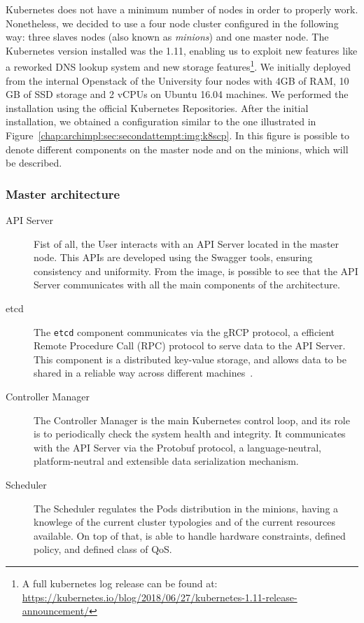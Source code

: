 Kubernetes does not have a minimum number of nodes in order to properly work.
Nonetheless, we decided to use a four node cluster configured in the following
way: three slaves nodes (also known as \emph{minions}) and one master node. The
Kubernetes version installed was the 1.11, enabling us to exploit new features
like a reworked DNS lookup system and new storage features\footnote{A full
  kubernetes log release can be found at:
  \url{https://kubernetes.io/blog/2018/06/27/kubernetes-1.11-release-announcement/}}.
We initially deployed from the internal Openstack of the University four nodes
with 4GB of RAM, 10 GB of SSD storage and 2 vCPUs on Ubuntu 16.04 machines. We
performed the installation using the official Kubernetes Repositories. After the
initial installation, we obtained a configuration similar to the one illustrated
in Figure~\ref{chap:archimpl:sec:secondattempt:img:k8scp}. In this figure is
possible to denote different components on the master node and on the minions,
which will be described.

\subsubsection{Master architecture}
\begin{description}
\item[API Server] Fist of all, the User interacts with an API Server located in
  the master node. This APIs are developed using the Swagger tools, ensuring
  consistency and uniformity. From the image, is possible to see that the API
  Server communicates with all the main components of the architecture.
\item[etcd] The \verb!etcd! component communicates via the gRCP protocol, a
  efficient Remote Procedure Call (RPC) protocol to serve data to the API
  Server. This component is a distributed key-value storage, and allows data to
  be shared in a reliable way across different machines~\cite{etcddatamodel}.
\item[Controller Manager] The Controller Manager is the main Kubernetes control
  loop, and its role is to periodically check the system health and integrity.
  It communicates with the API Server via the Protobuf protocol, a
  language-neutral, platform-neutral and extensible data serialization
  mechanism.
\item[Scheduler] The Scheduler regulates the Pods distribution in the minions,
  having a knowlege of the current cluster typologies and of the current
  resources available. On top of that, is able to handle hardware constraints,
  defined policy, and defined class of QoS.
\end{description}

